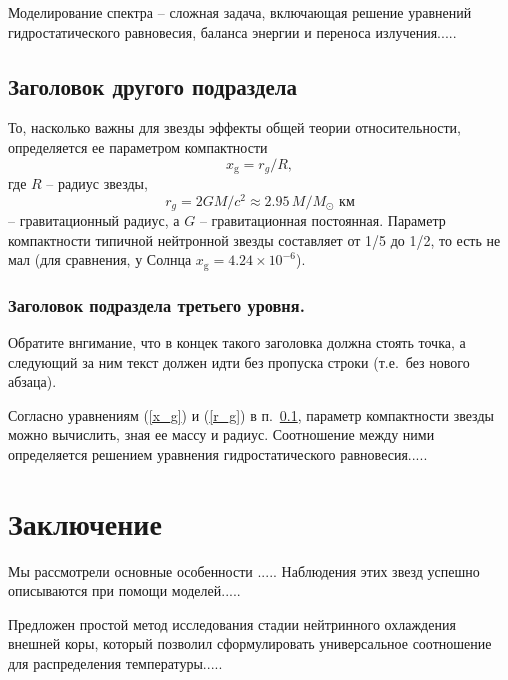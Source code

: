 \documentclass{pazh2col-win}
\begin{document}
Моделирование
спектра -- сложная задача, включающая решение уравнений
гидростатического равновесия, баланса энергии и переноса
излучения.....

\subsection{Заголовок другого подраздела}
\label{section_AA}

То, насколько важны для звезды эффекты общей теории относительности, определяется ее
параметром компактности
\begin{equation}
  x_\mathrm{g}=r_g/R,
\label{x_g}
\end{equation}
где $R$ -- радиус звезды,
\begin{equation}
  r_g=2GM/c^2\approx 2.95\,M/M_\odot \textrm{ км}
\label{r_g}
\end{equation}
-- гравитационный радиус, а $G$ -- гравитационная
постоянная. Параметр компактности типичной нейтронной
звезды составляет от 1/5 до 1/2, то есть не мал (для
сравнения, у Солнца $x_\mathrm{g}=4.24\times10^{-6}$).

\subsubsection{Заголовок подраздела третьего уровня.}
\label{section_BBB}
Обратите внгимание, что в концек такого заголовка должна стоять точка,
а следующий за ним текст должен идти без пропуска строки (т.е.\ без нового абзаца).

Согласно уравнениям (\ref{x_g}) и (\ref{r_g}) в п.~\ref{section_AA}, 
параметр компактности звезды можно вычислить, зная ее массу и радиус.
Соотношение между ними
определяется решением уравнения гидростатического равновесия.....

\section{Заключение}
\label{sect:concl}

Мы рассмотрели основные особенности .....  Наблюдения
этих звезд успешно описываются при помощи моделей..... 

Предложен простой метод исследования стадии нейтринного охлаждения
внешней коры, который позволил сформулировать универсальное соотношение
для распределения температуры.....
\end{document}
